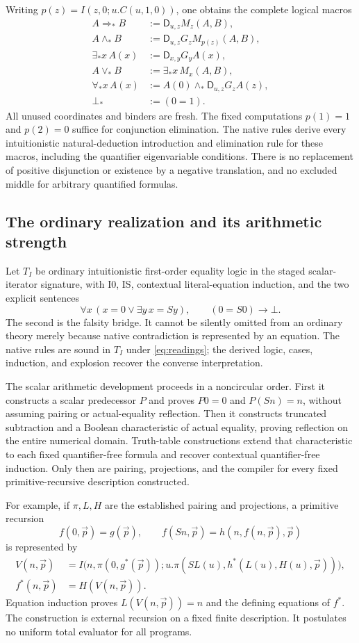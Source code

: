 \documentclass[11pt,letterpaper]{article}
\theoremstyle{definition}\newtheorem{definition}[theorem]{Definition}
\theoremstyle{remark}\newtheorem{remark}[theorem]{Remark}
\newcommand{\D}{\mathsf D}
\begin{document}
Writing $p(z)=I(z,0;u.C(u,1,0))$, one obtains the complete logical macros
\begin{align*}
 A\Rightarrow_*B&:=\D_{u,z}M_z(A,B),\\
 A\wedge_*B&:=\D_{u,z}G_zM_{p(z)}(A,B),\\
 \exists_*x\,A(x)&:=\D_{x,y}G_yA(x),\\
 A\vee_*B&:=\exists_*x\,M_x(A,B),\\
 \forall_*x\,A(x)&:=A(0)\wedge_*\D_{u,z}G_zA(z),\\
 \bot_*&:=(0=1).
\end{align*}
All unused coordinates and binders are fresh. The fixed computations
$p(1)=1$ and $p(2)=0$ suffice for conjunction elimination. The native rules
derive every intuitionistic natural-deduction introduction and elimination
rule for these macros, including the quantifier eigenvariable conditions.
There is no replacement of positive disjunction or existence by a negative
translation, and no excluded middle for arbitrary quantified formulas.

\subsection{The ordinary realization and its arithmetic strength}

Let $T_I$ be ordinary intuitionistic first-order equality logic in the staged
scalar-iterator signature, with I0, IS, contextual literal-equation induction,
and the two explicit sentences
\[
 \forall x\,(x=0\vee\exists y\,x=Sy),\qquad
 (0=S0)\to\bot.
\]
The second is the falsity bridge. It cannot be silently omitted from an
ordinary theory merely because native contradiction is represented by an
equation. The native rules are sound in $T_I$ under
\eqref{eq:readings}; the derived logic, cases, induction, and explosion
recover the converse interpretation.

The scalar arithmetic development proceeds in a noncircular order.
First it constructs a scalar predecessor $P$ and proves $P0=0$ and
$P(Sn)=n$, without assuming pairing or actual-equality reflection.
Then it constructs truncated subtraction and a Boolean characteristic
of actual equality, proving reflection on the entire numerical domain.
Truth-table constructions extend that characteristic to each fixed
quantifier-free formula and recover contextual quantifier-free induction.
Only then are pairing, projections, and the compiler for every fixed
primitive-recursive description constructed.

For example, if $\pi,L,H$ are the established pairing and projections,
a primitive recursion
\[
 f(0,\vec p)=g(\vec p),\qquad
 f(Sn,\vec p)=h(n,f(n,\vec p),\vec p)
\]
is represented by
\[
 \begin{split}
 V(n,\vec p)&=I\bigl(n,\pi(0,g^*(\vec p));
 u.\pi(SL(u),h^*(L(u),H(u),\vec p))\bigr),\\
 f^*(n,\vec p)&=H(V(n,\vec p)).
 \end{split}
\]
Equation induction proves $L(V(n,\vec p))=n$ and the defining equations
of $f^*$. The construction is external recursion on a fixed finite
description. It postulates no uniform total evaluator for all programs.
\end{document}
